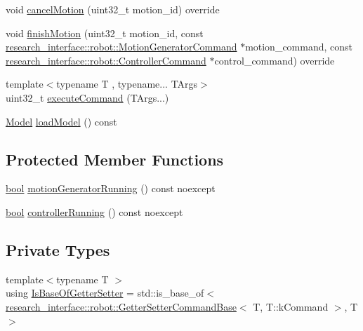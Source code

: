 \begin{DoxyCompactItemize}
\item 
void \hyperlink{classfranka_1_1Robot_1_1Impl_a30a3ca95296656edb350c49808c74385}{cancel\+Motion} (uint32\+\_\+t motion\+\_\+id) override
\item 
void \hyperlink{classfranka_1_1Robot_1_1Impl_a024cc4b7994e164a1468b4dd222f80ab}{finish\+Motion} (uint32\+\_\+t motion\+\_\+id, const \hyperlink{structresearch__interface_1_1robot_1_1MotionGeneratorCommand}{research\+\_\+interface\+::robot\+::\+Motion\+Generator\+Command} $\ast$motion\+\_\+command, const \hyperlink{structresearch__interface_1_1robot_1_1ControllerCommand}{research\+\_\+interface\+::robot\+::\+Controller\+Command} $\ast$control\+\_\+command) override
\item 
{\footnotesize template$<$typename T , typename... T\+Args$>$ }\\uint32\+\_\+t \hyperlink{classfranka_1_1Robot_1_1Impl_a6e018e65fddf90613219c2935327f80f}{execute\+Command} (T\+Args...)
\item 
\hyperlink{classfranka_1_1Model}{Model} \hyperlink{classfranka_1_1Robot_1_1Impl_af562b87b6d5d8f7ce271daaa82b88693}{load\+Model} () const
\end{DoxyCompactItemize}
\subsection*{Protected Member Functions}
\begin{DoxyCompactItemize}
\item 
\hyperlink{classbool}{bool} \hyperlink{classfranka_1_1Robot_1_1Impl_aa6b34693c27b529a52f7ea5a607c7252}{motion\+Generator\+Running} () const noexcept
\item 
\hyperlink{classbool}{bool} \hyperlink{classfranka_1_1Robot_1_1Impl_ac2d91fb2b9838536bcea8ab1aae4802e}{controller\+Running} () const noexcept
\end{DoxyCompactItemize}
\subsection*{Private Types}
\begin{DoxyCompactItemize}
\item 
{\footnotesize template$<$typename T $>$ }\\using \hyperlink{classfranka_1_1Robot_1_1Impl_a42d57d169b53c906439dbbde255c1bae}{Is\+Base\+Of\+Getter\+Setter} = std\+::is\+\_\+base\+\_\+of$<$ \hyperlink{structresearch__interface_1_1robot_1_1GetterSetterCommandBase}{research\+\_\+interface\+::robot\+::\+Getter\+Setter\+Command\+Base}$<$ T, T\+::k\+Command $>$, T $>$
\end{DoxyCompactItemize}
